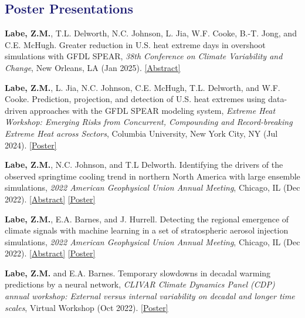 \documentclass[margin,line,palatino,courier,10pt]{res}
\begin{document}
\begin{resume}
\section{\sc \textcolor{MidnightBlue}{\large{\textbf{Poster Presentations}}}}
\begin{etaremune}[leftmargin=0in,topsep=0in,parsep=0in]
\item \textbf{Labe, Z.M.}, T.L. Delworth, N.C. Johnson, L. Jia, W.F. Cooke, B.-T. Jong, and C.E. McHugh. Greater reduction in U.S. heat extreme days in overshoot simulations with GFDL SPEAR, \textit{38th Conference on Climate Variability and Change}, New Orleans, LA (Jan 2025). \href{https://ams.confex.com/ams/105ANNUAL/meetingapp.cgi/Paper/451978}{[Abstract]}
\item \textbf{Labe, Z.M.}, L. Jia, N.C. Johnson, C.E. McHugh, T.L. Delworth, and W.F. Cooke. Prediction, projection, and detection of U.S. heat extremes using data-driven approaches with the GFDL SPEAR modeling system, \textit{Extreme Heat Workshop: Emerging Risks from Concurrent, Compounding and Record-breaking Extreme Heat across Sectors}, Columbia University, New York City, NY (Jul 2024). \href{https://zacklabe.com/wp-content/uploads/2024/07/zlabe_heatwaveworkshop_poster_2024_final.pdf}{[Poster]}
\item \textbf{Labe, Z.M.}, N.C. Johnson, and T.L Delworth. Identifying the drivers of the observed springtime cooling trend in northern North America with large ensemble simulations, \textit{2022 American Geophysical Union Annual Meeting}, Chicago, IL (Dec 2022). \href{https://agu.confex.com/agu/fm22/meetingapp.cgi/Paper/1111909}{[Abstract]} \href{https://zacklabe.files.wordpress.com/2022/12/labejohnsondelworth_agu_largeensembles2022_poster.pdf}{[Poster]}
\item \textbf{Labe, Z.M.}, E.A. Barnes, and J. Hurrell. Detecting the regional emergence of climate signals with machine learning in a set of stratospheric aerosol injection simulations, \textit{2022 American Geophysical Union Annual Meeting}, Chicago, IL (Dec 2022). \href{https://agu.confex.com/agu/fm22/meetingapp.cgi/Paper/1110391}{[Abstract]} \href{https://zacklabe.files.wordpress.com/2022/12/labebarneshurrell_agu_sai2022_poster.pdf}{[Poster]}
\item \textbf{Labe, Z.M.} and E.A. Barnes. Temporary slowdowns in decadal warming predictions by a neural network, \textit{CLIVAR Climate Dynamics Panel (CDP) annual workshop: External versus internal variability on decadal and longer time scales}, Virtual Workshop (Oct 2022). \href{https://zacklabe.files.wordpress.com/2022/09/labebarnes_poster_10-2022.pdf}{[Poster]}

\end{etaremune}
\end{resume}
\end{document}
